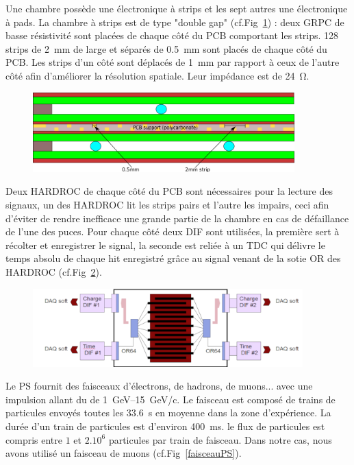 Une chambre possède une électronique à strips et les sept autres une électronique à pads. La chambre à strips est de type "double gap" (cf.Fig~\ref{DoubleGap}) : deux GRPC de basse résistivité sont placées de chaque côté du PCB comportant les strips. \num{128} strips de \SI{2}{\milli\meter} de large et séparés de \SI{0.5}{\milli\meter} sont placés de chaque côté du PCB. Les strips d'un côté sont déplacés de \SI{1}{\milli\meter} par rapport à ceux de l'autre côté afin d'améliorer la résolution spatiale. Leur impédance est de \SI{24}{\ohm}. 

\begin{figure}[ht!]
	\centering
	\includegraphics[width=0.9\textwidth]{GLA/DoubleGap.png}
	\label{DoubleGap}
\end{figure}

Deux HARDROC de chaque côté du PCB sont nécessaires pour la lecture des signaux, un des HARDROC lit les strips pairs et l'autre les impairs, ceci afin d'éviter de rendre inefficace une grande partie de la chambre en cas de défaillance de l'une des puces. Pour chaque côté deux DIF sont utilisées, la première sert à récolter et enregistrer le signal, la seconde est reliée à un TDC qui délivre le temps absolu de chaque hit enregistré grâce au signal venant de la sotie OR des HARDROC (cf.Fig~\ref{SchemePS}).

\begin{figure}[ht!]
	\centering
	\includegraphics[width=0.93\textwidth]{GLA/SchemePS.png}
	\label{SchemePS}
\end{figure}

Le PS fournit des faisceaux d'électrons, de hadrons, de muons... avec une impulsion allant du de \SIrange{1}{15}{\giga\eV}/c. Le faisceau est composé de trains de particules envoyés toutes les \SI{33.6}{\second} en moyenne dans la zone d'expérience. La durée d'un train de particules est d'environ \SI{400}{\milli\second}. le flux de particules est compris entre $1$ et $2.10^{6}$ particules par train de faisceau. Dans notre cas, nous avons utilisé un faisceau de muons (cf.Fig~\ref{faisceauPS}).
 
